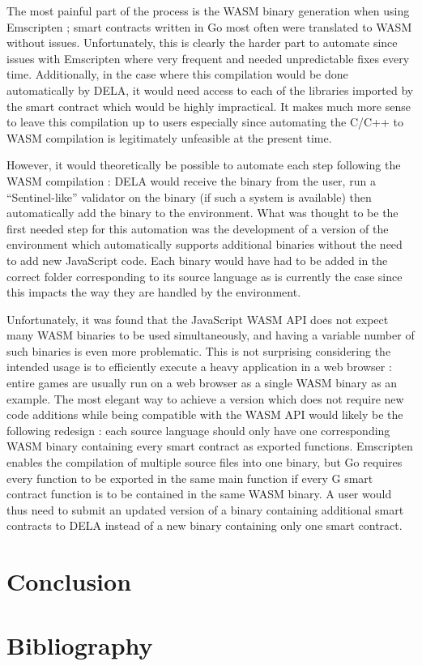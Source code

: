 \documentclass[11pt, a4paper, twoside, openright]{article}
\begin{document}
The most painful part of the process is the WASM binary generation when using Emscripten ; smart contracts written in Go most often were translated to WASM without issues. Unfortunately, this is clearly the harder part to automate since issues with Emscripten where very frequent and needed unpredictable fixes every time. Additionally, in the case where this compilation would be done automatically by DELA, it would need access to each of the libraries imported by the smart contract which would be highly impractical. It makes much more sense to leave this compilation up to users especially since automating the C/C++ to WASM compilation is legitimately unfeasible at the present time.

However, it would theoretically be possible to automate each step following the WASM compilation : DELA would receive the binary from the user, run a ``Sentinel-like'' validator on the binary (if such a system is available) then automatically add the binary to the environment. What was thought to be the first needed step for this automation was the development of a version of the environment which automatically supports additional binaries without the need to add new JavaScript code. Each binary would have had to be added in the correct folder corresponding to its source language as is currently the case since this impacts the way they are handled by the environment. 

Unfortunately, it was found that the JavaScript WASM API does not expect many WASM binaries to be used simultaneously, and having a variable number of such binaries is even more problematic. This is not surprising considering the intended usage is to efficiently execute a heavy application in a web browser : entire games are usually run on a web browser as a single WASM binary as an example. The most elegant way to achieve a version which does not require new code additions while being compatible with the WASM API would likely be the following redesign : each source language should only have one corresponding WASM binary containing every smart contract as exported functions. Emscripten enables the compilation of multiple source files into one binary, but Go requires every function to be exported in the same main function if every G smart contract function is to be contained in the same WASM binary. A user would thus need to submit an updated version of a binary containing additional smart contracts to DELA instead of a new binary containing only one smart contract.

\section{Conclusion}
\newpage
\section{Bibliography}


\end{document}
